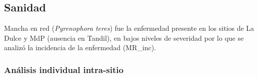 \documentclass[
  letterpaper,
  DIV=11,
  numbers=noendperiod]{scrreprt}
\begin{document}
\hypertarget{sanidad}{%
\subsection{Sanidad}\label{sanidad}}

Mancha en red (\emph{Pyrenophora teres}) fue la enfermedad presente en
los sitios de La Dulce y MdP (ausencia en Tandil), en bajos niveles de
severidad por lo que se analizó la incidencia de la enfermedad
(MR\_inc).

\hypertarget{anuxe1lisis-individual-intra-sitio-1}{%
\subsubsection*{Análisis individual
intra-sitio}\label{anuxe1lisis-individual-intra-sitio-1}}

 
  \providecommand{\huxb}[2]{\arrayrulecolor[RGB]{#1}\global\arrayrulewidth=#2pt}
  \providecommand{\huxvb}[2]{\color[RGB]{#1}\vrule width #2pt}
  \providecommand{\huxtpad}[1]{\rule{0pt}{#1}}
  \providecommand{\huxbpad}[1]{\rule[-#1]{0pt}{#1}}
\end{document}
